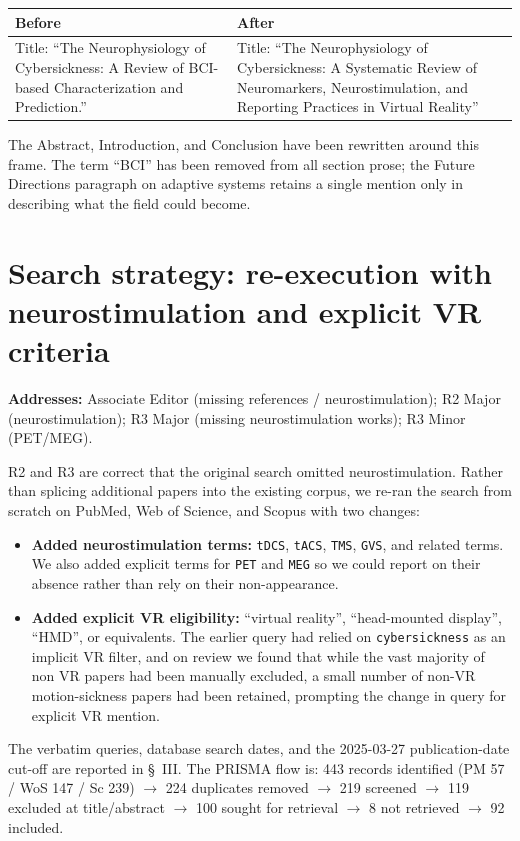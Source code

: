 \documentclass[11pt,a4paper]{article}
\makeatletter
\newcommand{\diffbox}[2]{%
  \begin{center}
  \small
  \begin{tabular}{@{}p{0.46\textwidth}@{\hspace{2em}}p{0.46\textwidth}@{}}
  \toprule
  \textbf{Before} & \textbf{After} \\
  \midrule
  #1 & #2 \\
  \bottomrule
  \end{tabular}
  \end{center}}
\newcommand{\addresses}[1]{\par\noindent\textbf{\small Addresses:} {\small #1}\par\smallskip}
\makeatother
\begin{document}
\diffbox{Title: ``The Neurophysiology of Cybersickness: A Review of BCI-based Characterization and Prediction.''}{Title: ``The Neurophysiology of Cybersickness: A Systematic Review of Neuromarkers, Neurostimulation, and Reporting Practices in Virtual Reality''}

The Abstract, Introduction, and Conclusion have been rewritten around this frame. The term ``BCI'' has been removed from all section prose; the Future Directions paragraph on adaptive systems retains a single mention only in describing what the field could become.

\section{Search strategy: re-execution with neurostimulation and explicit VR criteria}\label{sec:search}
\addresses{Associate Editor (missing references / neurostimulation); R2 Major (neurostimulation); R3 Major (missing neurostimulation works); R3 Minor (PET/MEG).}

R2 and R3 are correct that the original search omitted neurostimulation. Rather than splicing additional papers into the existing corpus, we re-ran the search from scratch on PubMed, Web of Science, and Scopus with two changes:
\begin{itemize}
  \item \textbf{Added neurostimulation terms:} \texttt{tDCS}, \texttt{tACS}, \texttt{TMS}, \texttt{GVS}, and related terms. We also added explicit terms for \texttt{PET} and \texttt{MEG} so we could report on their absence rather than rely on their non-appearance.
  \item \textbf{Added explicit VR eligibility:} ``virtual reality'', ``head-mounted display'', ``HMD'', or equivalents. The earlier query had relied on \texttt{cybersickness} as an implicit VR filter, and on review we found that while the vast majority of non VR papers had been manually excluded, a small number of non-VR motion-sickness papers had been retained, prompting the change in query for explicit VR mention.
\end{itemize}

\noindent The verbatim queries, database search dates, and the 2025-03-27 publication-date cut-off are reported in \S~III. The PRISMA flow is: 443 records identified (PM 57 / WoS 147 / Sc 239) $\rightarrow$ 224 duplicates removed $\rightarrow$ 219 screened $\rightarrow$ 119 excluded at title/abstract $\rightarrow$ 100 sought for retrieval $\rightarrow$ 8 not retrieved $\rightarrow$ 92 included.
\end{document}
